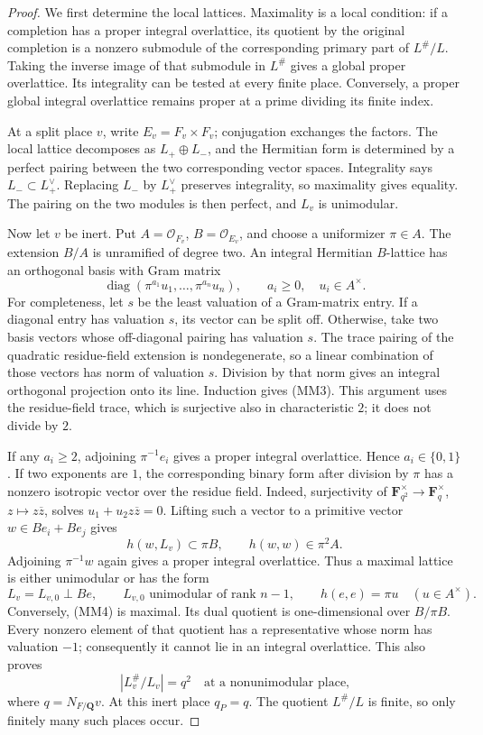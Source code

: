 \begin{proof}
We first determine the local lattices.  Maximality is a local
condition: if a completion has a proper integral overlattice, its
quotient by the original completion is a nonzero submodule of the
corresponding primary part of \(L^\#/L\).  Taking the inverse image
of that submodule in \(L^\#\) gives a global proper overlattice.
Its integrality can be tested at every finite place.  Conversely,
a proper global integral overlattice remains proper at a prime
dividing its finite index.

At a split place \(v\), write
\(E_v=F_v\times F_v\); conjugation exchanges the factors.  The local
lattice decomposes as \(L_+\oplus L_-\), and the Hermitian form is
determined by a perfect pairing between the two corresponding
vector spaces.  Integrality says \(L_-\subset L_+^\vee\).
Replacing \(L_-\) by \(L_+^\vee\) preserves integrality, so
maximality gives equality.  The pairing on the two modules is then
perfect, and \(L_v\) is unimodular.

Now let \(v\) be inert.  Put \(A=\mathcal O_{F_v}\),
\(B=\mathcal O_{E_v}\), and choose a uniformizer \(\pi\in A\).
The extension \(B/A\) is unramified of degree two.  An integral
Hermitian \(B\)-lattice has an orthogonal basis with Gram matrix
\[
 \operatorname{diag}(\pi^{a_1}u_1,\ldots,\pi^{a_n}u_n),
 \qquad a_i\geq0,\quad u_i\in A^\times.
 \tag{MM3}
\]
For completeness, let \(s\) be the least valuation of a Gram-matrix
entry.  If a diagonal entry has valuation \(s\), its vector can
be split off.  Otherwise, take two basis vectors whose off-diagonal
pairing has valuation \(s\).  The trace pairing of the quadratic
residue-field extension is nondegenerate, so a linear combination
of those vectors has norm of valuation \(s\).  Division by that
norm gives an integral orthogonal projection onto its line.
Induction gives (MM3).  This argument uses the residue-field trace,
which is surjective also in characteristic \(2\); it does not
divide by \(2\).

If any \(a_i\geq2\), adjoining \(\pi^{-1}e_i\) gives a proper
integral overlattice.  Hence \(a_i\in\{0,1\}\).  If two exponents
are \(1\), the corresponding binary form after division by \(\pi\)
has a nonzero isotropic vector over the residue field.  Indeed,
surjectivity of
\(\mathbf F_{q^2}^{\times}\to\mathbf F_q^\times\),
\(z\mapsto z\overline z\), solves
\(u_1+u_2z\overline z=0\).  Lifting such a vector to a primitive
vector \(w\in Be_i+Be_j\) gives
\[
 h(w,L_v)\subset\pi B,\qquad h(w,w)\in\pi^2A.
\]
Adjoining \(\pi^{-1}w\) again gives a proper integral overlattice.
Thus a maximal lattice is either unimodular or has the form
\[
 L_v=L_{v,0}\perp Be,\qquad
 L_{v,0}\text{ unimodular of rank }n-1,\qquad h(e,e)=\pi u
 \quad(u\in A^\times).
 \tag{MM4}
\]
Conversely, (MM4) is maximal.  Its dual quotient is one-dimensional
over \(B/\pi B\).  Every nonzero element of that quotient has a
representative whose norm has valuation \(-1\); consequently it
cannot lie in an integral overlattice.  This also proves
\[
 |L_v^\#/L_v|=q^2
 \quad\text{at a nonunimodular place,}
 \tag{MM5}
\]
where \(q=N_{F/\mathbf Q}v\).  At this inert place \(q_P=q\).
The quotient \(L^\#/L\) is finite, so only finitely many such places
occur.


\end{proof}

